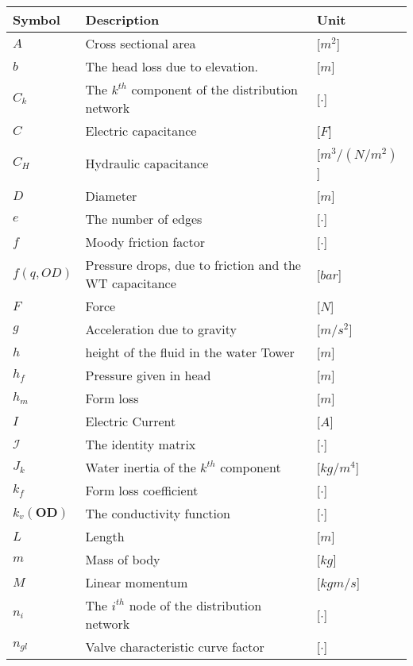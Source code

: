 \begin{tabular}{l l l} 
	\textbf{Symbol}		&	\textbf{Description}										& \textbf{Unit}	\\\hline
	$A$					&	Cross sectional area									    & [$m^2$]\\
	$b$					&	The head loss due to elevation. 						    & [$m$]\\
	$C_k$				&	The $k^{th}$ component of the distribution network     		& [$\cdot$]\\
	$C$					&	Electric capacitance								   		& [$F$]\\
	$C_H$				&	Hydraulic capacitance								   		& [$m^3/(N/m^2)$]\\
	$D$					&	Diameter									     			& [$m$]\\
	$e$					&	The number of edges									     	& [$\cdot$]\\	
	$f$					&	Moody friction factor									    & [$\cdot$]\\
	$f(q,OD)$			&	Pressure drops, due to friction and the WT capacitance		& [$bar$]\\
	$F$					&	Force									     				& [$N$]\\
	$g$					&	Acceleration due to gravity									& [$m/s^2$]\\
	$h$					&	height of the fluid in the water Tower						& [$m$]\\
	$h_f$				&	Pressure given in head									    & [$m$]\\
	$h_m$				&	Form loss									    			& [$m$]\\
	$I$					&	Electric Current 											& [$A$]\\
	$\bm{\mathcal{I}}$  &	The identity matrix 										& [$\cdot$]\\
	$J_k$				&	Water inertia of the $k^{th}$ component						& [$kg/m^4$]\\
	$k_f$				&	Form loss coefficient								    	& [$\cdot$]\\
	$k_v(\bm{OD})$		&	The conductivity function								    & [$\cdot$]\\	
	$L$					&	Length									     				& [$m$]\\
	$m$					&	Mass of body									     		& [$kg$]\\
	$M$					&	Linear momentum									     		& [$kgm/s$]\\
	$n_i$				&	The $i^{th}$ node of the distribution network     			& [$\cdot$]\\
	$n_{gl}$			&	Valve characteristic curve factor							& [$\cdot$]\\

\end{tabular}
